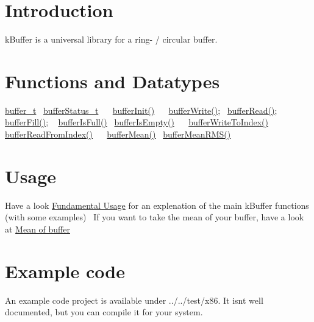 \hypertarget{index_intro}{}\section{Introduction}\label{index_intro}
k\+Buffer is a universal library for a ring-\/ / circular buffer. \hypertarget{index_function}{}\section{Functions and Datatypes}\label{index_function}
\hyperlink{structbuffer__t}{buffer\+\_\+t}~\newline
 \hyperlink{k_buffer_8h_a7a0bf550b7bd49d85172e409c0034fe6}{buffer\+Status\+\_\+t}~\newline
 ~\newline
 \hyperlink{k_buffer_8c_aec18d6ea571b1326dbeb7ca15f4969c0}{buffer\+Init()}~\newline
 ~\newline
 \hyperlink{k_buffer_8c_a9d6410a89adf65a3ef12340ecb9bbd55}{buffer\+Write()};~\newline
 \hyperlink{k_buffer_8c_a9b80be9033ccd6b5a101f811520ab4cc}{buffer\+Read()};~\newline
 ~\newline
 \hyperlink{k_buffer_8c_ac806d926fd21729feb18f8e7738e76b4}{buffer\+Fill()}; ~\newline
 \hyperlink{k_buffer_8c_ac69b8a12a33d0cf0a5dab8feb4f7b020}{buffer\+Is\+Full()}~\newline
 \hyperlink{k_buffer_8c_a5c599b9386c73ccd7b5eeb25f6cca38e}{buffer\+Is\+Empty()}~\newline
 ~\newline
 \hyperlink{k_buffer_8c_a8508583be1e356a243b0ce67254c516e}{buffer\+Write\+To\+Index()}~\newline
 \hyperlink{k_buffer_8c_aa0d7e2a4b6fd3da2822d7f968be74e5c}{buffer\+Read\+From\+Index()}~\newline
 ~\newline
 \hyperlink{k_buffer_8c_a1389f5c08210e077301c35bc3b43f681}{buffer\+Mean()}~\newline
 \hyperlink{k_buffer_8c_a1da694b34c0a52809c923d2d149d1348}{buffer\+Mean\+R\+M\+S()}~\newline
 \hypertarget{index_usage}{}\section{Usage}\label{index_usage}
Have a look \hyperlink{fundamental_usage}{Fundamental Usage} for an explenation of the main k\+Buffer functions (with some examples)~\newline
 If you want to take the mean of your buffer, have a look at \hyperlink{mean}{Mean of buffer} \hypertarget{index_example}{}\section{Example code}\label{index_example}
An example code project is available under ../../test/x86. It isn\textquotesingle{}t well documented, but you can compile it for your system. 